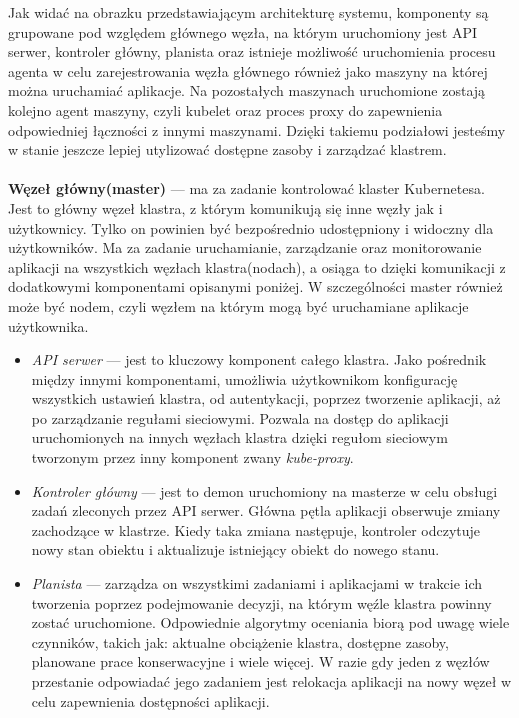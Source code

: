 \documentclass[12pt]{report}
\begin{document}
{Jak widać na obrazku przedstawiającym architekturę systemu, komponenty są grupowane pod względem głównego węzła, na którym uruchomiony jest API serwer, kontroler główny, planista oraz istnieje możliwość uruchomienia procesu agenta w celu zarejestrowania węzła głównego również jako maszyny na której można uruchamiać aplikacje. Na pozostałych maszynach uruchomione zostają kolejno agent maszyny, czyli kubelet oraz proces proxy do zapewnienia odpowiedniej łączności z innymi maszynami. Dzięki takiemu podziałowi jesteśmy w stanie jeszcze lepiej utylizować dostępne zasoby i zarządzać klastrem. \\
\\
{\bf Węzeł główny(master)} --- ma za zadanie kontrolować klaster Kubernetesa. Jest to główny węzeł klastra, z którym komunikują się inne węzły jak i użytkownicy. Tylko on powinien być bezpośrednio udostępniony i widoczny dla użytkowników. Ma za zadanie uruchamianie, zarządzanie oraz monitorowanie aplikacji na wszystkich węzłach klastra(nodach), a osiąga to dzięki komunikacji z dodatkowymi komponentami opisanymi poniżej. W szczególności master również może być nodem, czyli węzłem na którym mogą być uruchamiane aplikacje użytkownika.

\begin{itemize}
\item{{\it API serwer} --- jest to kluczowy komponent całego klastra. Jako pośrednik między innymi komponentami, umożliwia użytkownikom konfigurację wszystkich ustawień klastra, od autentykacji, poprzez tworzenie aplikacji, aż po zarządzanie regułami sieciowymi. Pozwala na dostęp do aplikacji uruchomionych na innych węzłach klastra dzięki regułom sieciowym tworzonym przez inny komponent zwany {\it kube-proxy}.}

\item{{\it Kontroler główny} --- jest to demon uruchomiony na masterze w celu obsługi zadań zleconych przez API serwer. Główna pętla aplikacji obserwuje zmiany zachodzące w klastrze. Kiedy taka zmiana następuje, kontroler odczytuje nowy stan obiektu i aktualizuje istniejący obiekt do nowego stanu.}

\item{{\it Planista} --- zarządza on wszystkimi zadaniami i aplikacjami w trakcie ich tworzenia poprzez podejmowanie decyzji, na którym węźle klastra powinny zostać uruchomione. Odpowiednie algorytmy oceniania biorą pod uwagę wiele czynników, takich jak: aktualne obciążenie klastra, dostępne zasoby, planowane prace konserwacyjne i wiele więcej. W razie gdy jeden z węzłów przestanie odpowiadać jego zadaniem jest relokacja aplikacji na nowy węzeł w celu zapewnienia dostępności aplikacji.}


\end{itemize}}
\end{document}
